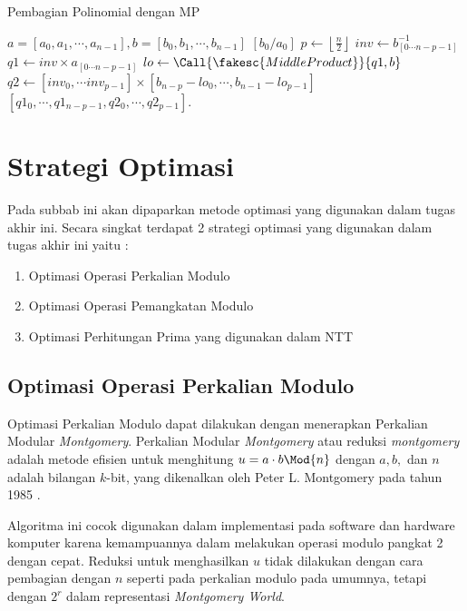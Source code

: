 \begin{algorithm}
	\caption{Pembagian Polinomial dengan MP}
	\label{psdo:pembagian_poli_mp}
	\begin{algorithmic}[1]
		\Require $a = [a_0, a_1, \cdots, a_{n-1}], b = [b_0, b_1, \cdots, b_{n-1}]$
		\State \Return $ \left [b_0/a_0\right ] $ 
		\EndIf
		\State $ p \leftarrow \left \lfloor \frac{n}{2} \right \rfloor $
		\State $ inv \leftarrow b_{[0 \cdots n - p - 1]}^{-1} $
		\State $ q1 \leftarrow inv \times a_{[0 \cdots n - p - 1]} $
		\State $ lo \leftarrow \Call{\fakesc{MiddleProduct}}{q1, b} $
		\State $ q2 \leftarrow \left[ inv_0, \cdots inv_{p-1} \right] \times \left[ b_{n-p} - lo_{0}, \cdots,  b_{n-1} - lo_{p-1} \right] $
		\State \Return $ [q1_0, \cdots, q1_{n-p-1}, q2_0, \cdots, q2_{p-1}] $.
	\end{algorithmic}
\end{algorithm}

\section{Strategi Optimasi}
Pada subbab ini akan dipaparkan metode optimasi yang digunakan dalam tugas akhir ini. Secara singkat terdapat 2 strategi optimasi yang digunakan dalam tugas akhir ini yaitu :
\begin{enumerate}
	\item Optimasi Operasi Perkalian Modulo
	\item Optimasi Operasi Pemangkatan Modulo
	\item Optimasi Perhitungan Prima yang digunakan dalam NTT
\end{enumerate}

\subsection{Optimasi Operasi Perkalian Modulo}
Optimasi Perkalian Modulo dapat dilakukan dengan menerapkan Perkalian Modular \textit{Montgomery}. Perkalian Modular \textit{Montgomery} atau reduksi \textit{montgomery} adalah metode efisien untuk menghitung $ u = a \cdot b \Mod{n} $ dengan $ a, b, $ dan $ n $ adalah  bilangan $k$-bit, yang dikenalkan oleh Peter L. Montgomery pada tahun 1985 \cite{montgomery}. 

Algoritma ini cocok digunakan dalam implementasi pada software dan hardware komputer karena kemampuannya dalam melakukan operasi modulo pangkat 2 dengan cepat. Reduksi untuk menghasilkan $ u $ tidak dilakukan dengan cara pembagian dengan $ n $ seperti pada perkalian modulo pada umumnya, tetapi dengan $ 2^r $ dalam representasi \textit{Montgomery World}.

